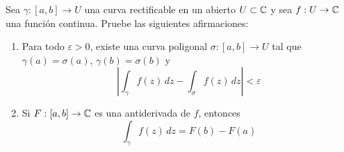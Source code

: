\begin{exercise}
Sea $\gamma : [a,b] \to U$ una curva rectificable en un abierto $U \subset \mathbb C$ y sea $f : U \to \mathbb C$ una función continua. Pruebe las siguientes afirmaciones:
\begin{enumerate}[label=(\alph*)]
    \item Para todo $\varepsilon > 0$, existe una curva poligonal $\sigma : [a,b] \to U$ tal que $\gamma(a) = \sigma(a)$, $\gamma(b) = \sigma(b)$ y
    $$\left| \int_\gamma f(z) \, dz - \int_\sigma f(z) \, dz \right| < \varepsilon$$
    
    \item Si $F : [a,b] \to \mathbb C$ es una antiderivada de $f$, entonces
    $$\int_\gamma f(z) \, dz = F(b) - F(a)$$
\end{enumerate}
\end{exercise}

